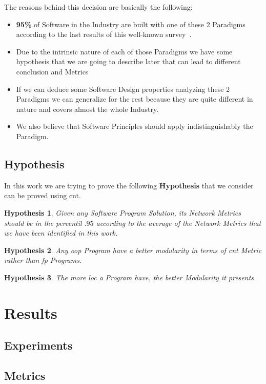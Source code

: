 \documentclass[12pt, a4paper]{article}
\newtheorem{hyp}{Hypothesis}
\begin{document}
The reasons behind this decision are basically the following:

\begin{itemize}
    \item \textbf{95\%} of Software in the Industry are built with one of these 2 Paradigms according to the last results of this well-known survey~\cite{so_survey}.
    \item Due to the intrinsic nature of each of those Paradigms we have some hypothesis that we are going to describe later that can lead to different conclusion and Metrics
    \item If we can deduce some Software Design properties analyzing these 2 Paradigms we can generalize for the rest because they are quite different in nature and covers almost the whole Industry.
    \item We also believe that Software Principles should apply indistinguishably the Paradigm. 
\end{itemize}


\subsection{Hypothesis}
In this work we are trying to prove the following \textbf{Hypothesis} that we consider can be proved using \acrfull{cnt}.

\begin{hyp}
Given any Software Program Solution, its Network Metrics should be in the percentil $.95$ according to the average of the Network Metrics that we have been identified in this work.
\end{hyp}

\begin{hyp}
Any \acrlong{oop} Program have a better modularity in terms of \acrlong{cnt} Metric rather than \acrlong{fp} Programs.
\end{hyp}

\begin{hyp}
The more \acrfull{loc} a Program have, the better Modularity it presents.
\end{hyp}
    

\section{Results}
\subsection{Experiments}
\subsection{Metrics}
\end{document}
